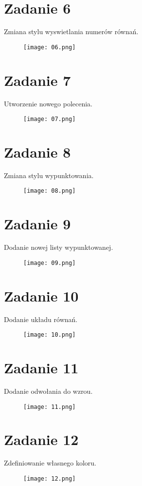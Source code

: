 \documentclass[fleqn,onecolumn,a4paper,12pt,titlepage]{article}
\begin{document}
\section*{Zadanie 6}
Zmiana stylu wyswietlania numerów równań.
\begin{figure}[H]%
    \centering\texttt{[image: 06.png]}
\end{figure}

\section*{Zadanie 7}
Utworzenie nowego polecenia.
\begin{figure}[H]%
    \centering\texttt{[image: 07.png]}
\end{figure}

\section*{Zadanie 8}
Zmiana stylu wypunktowania.
\begin{figure}[H]%
    \centering\texttt{[image: 08.png]}
\end{figure}

\section*{Zadanie 9}
Dodanie nowej listy wypunktowanej.
\begin{figure}[H]%
    \centering\texttt{[image: 09.png]}
\end{figure}

\section*{Zadanie 10}
Dodanie układu równań.
\begin{figure}[H]%
    \centering\texttt{[image: 10.png]}
\end{figure}

\section*{Zadanie 11}
Dodanie odwołania do wzrou.
\begin{figure}[H]%
    \centering\texttt{[image: 11.png]}
\end{figure}

\section*{Zadanie 12}
Zdefiniowanie własnego koloru.
\begin{figure}[H]%
    \centering\texttt{[image: 12.png]}
\end{figure}
\end{document}
